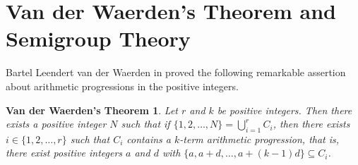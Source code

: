 \documentclass[12pt,showtrims]{memoir}
\theoremstyle{plain}
\newtheorem{vdw}[thm]{Van der Waerden's Theorem}
\theoremstyle{definition}
\begin{document}
\addtolength{\baselineskip}{1.7pt}

\section{Van der Waerden's Theorem and Semigroup Theory}
Bartel Leendert van der Waerden in \cite{Van-der-Waerden:1927fk} proved the following remarkable assertion about arithmetic progressions in the positive integers.

\begin{vdw}
  Let $r$ and $k$ be positive integers.
  Then there exists a positive integer $N$ such that if $\{1, 2, \ldots, N\} = \bigcup_{i=1}^r C_i$, then there exists $i \in \{1, 2, \ldots, r\}$ such that $C_i$ contains a $k$-term arithmetic progression, that is, there exist positive integers $a$ and $d$ with $\{a, a+d, \ldots, a + (k-1)d\} \subseteq C_i$.
\end{vdw}
 
\end{document}
